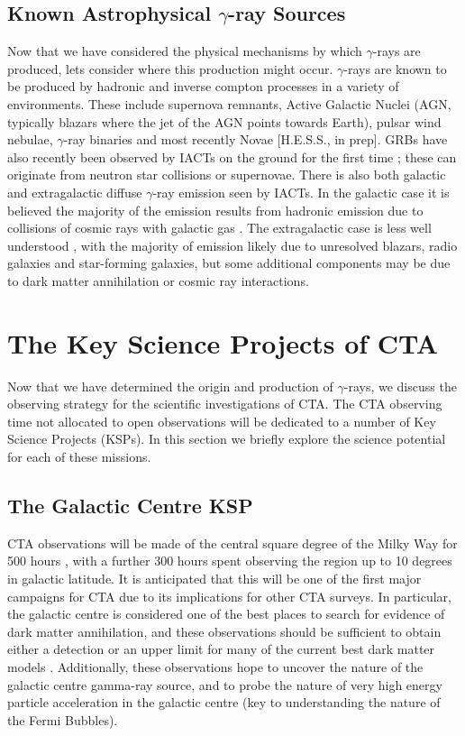 \subsection{Known Astrophysical \ensuremath{\gamma}-ray Sources}
Now that we have considered the physical mechanisms by which $\gamma$-rays are produced, lets consider where this production might occur. $\gamma$-rays are known to be produced by hadronic and inverse compton processes in a variety of environments. These include supernova remnants, Active Galactic Nuclei (AGN, typically blazars where the jet of the AGN points towards Earth), pulsar wind nebulae, $\gamma$-ray binaries \cite{scienceCTA} and most recently Novae [H.E.S.S., in prep]. GRBs have also recently been observed by IACTs on the ground for the first time \cite{magicGRB}; these can originate from neutron star collisions or supernovae. There is also both galactic and extragalactic diffuse $\gamma$-ray emission seen by IACTs. In the galactic case it is believed the majority of the emission results from hadronic emission due to collisions of cosmic rays with galactic gas \cite{extragamma}. The extragalactic case is less well understood \cite{extragamma}, with the majority of emission likely due to unresolved blazars, radio galaxies and star-forming galaxies, but some additional components may be due to dark matter annihilation or cosmic ray interactions.

\section{The Key Science Projects of CTA}
Now that we have determined the origin and production of $\gamma$-rays, we discuss the observing strategy for the scientific investigations of CTA. The CTA observing time not allocated to open observations will be dedicated to a number of Key Science Projects (KSPs). In this section we briefly explore the science potential for each of these missions.

\subsection{The Galactic Centre KSP}
CTA observations will be made of the central square degree of the Milky Way for 500 hours \cite{scienceCTA}, with a further 300 hours spent observing the region up to 10 degrees in galactic latitude. It is anticipated that this will be one of the first major campaigns for CTA due to its implications for other CTA surveys.
In particular, the galactic centre is considered one of the best places to search for evidence of dark matter annihilation, and these observations should be sufficient to obtain either a detection or an upper limit for many of the current best dark matter models \cite{scienceCTA}. Additionally, these observations hope to uncover the nature of the galactic centre gamma-ray source, and to probe the nature of very high energy particle acceleration in the galactic centre (key to understanding the nature of the Fermi Bubbles). 

